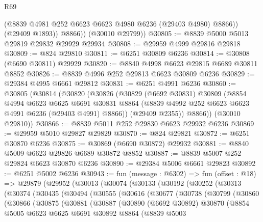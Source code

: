 \begin{lexlean}{R69}
\begin{coremodule}
{              (@8839 @4981 @252 @6623 @6623 @4980 @6236 (@29403 @4980) @8866))
            (@29409 @1893))
          @8866))
      (@30010 @29799))
@30805 := @8839 @5000 @5013 @29819 @29832 @29929 @29934
@30808 := @29959 @4999 @29816 @29818
@30809 := @824 @29810
@30811 := @6251 @30809 @6236
@30814 := @30808 (@6690 @30811) @29929
@30820 := @8840 @4998 @6623 @29815 @6689 @30811 @8852
@30826 := @8839 @4996 @252 @29813 @6623 @30809 @6236
@30829 := @29384 @4995 @6661 @29812
@30831 := @6251 @4991 @6236
@30860 := @30805
    (@30814
      (@30820
        (@30826
          (@30829
            (@6692 @30831)
            @30809
            (@8854
              @4994
              @6623
              @6625
              @6691
              @30831
              @8864
              (@8839 @4992 @252 @6623 @6623 @4991 @6236 (@29403 @4991) @8866))
            (@29409 @2355))
          @8866))
      (@30010 @29810))
@30866 := @8839 @5011 @252 @29830 @6623 @29932 @6236
@30869 := @29959 @5010 @29827 @29829
@30870 := @824 @29821
@30872 := @6251 @30870 @6236
@30875 := @30869 (@6690 @30872) @29932
@30881 := @8840 @5009 @6623 @29826 @6689 @30872 @8852
@30887 := @8839 @5007 @252 @29824 @6623 @30870 @6236
@30890 := @29384 @5006 @6661 @29823
@30892 := @6251 @5002 @6236
@30943 := fun (message : @6302) =>
  fun (offset : @18) =>
  @29879
    (@29952
      (@30013
        (@30074
          (@30133
            (@30192
              (@30252
                (@30313
                  (@30374
                    (@30435
                      (@30494
                        (@30555
                          (@30616
                            (@30677
                              (@30738
                                (@30799
                                  (@30860
                                    (@30866
                                      (@30875
                                        (@30881
                                          (@30887
                                            (@30890
                                              (@6692 @30892)
                                              @30870
                                              (@8854
                                                @5005
                                                @6623
                                                @6625
                                                @6691
                                                @30892
                                                @8864
                                                (@8839
                                                  @5003
}
\end{coremodule}
\end{lexlean}
